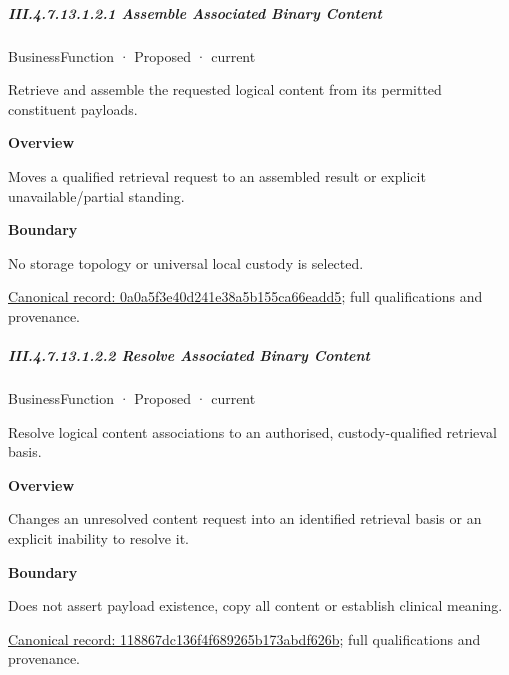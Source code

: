 \subparagraph*{III.4.7.13.1.2.1 Assemble Associated Binary Content}
\label{navigation:III.4.7.13.1.2.1}

\label{element:0a0a5f3e40d241e38a5b155ca66eadd5}
{\small BusinessFunction · Proposed · current}\par

Retrieve and assemble the requested logical content from its permitted constituent payloads.



\textbf{Overview}



Moves a qualified retrieval request to an assembled result or explicit unavailable/partial standing.



\textbf{Boundary}



No storage topology or universal local custody is selected.


{\footnotesize \href{../../../../continuum/business/business-function/0a0a5f3e40d241e38a5b155ca66eadd5.md}{Canonical record: 0a0a5f3e40d241e38a5b155ca66eadd5}; full qualifications and provenance.}\par
\subparagraph*{III.4.7.13.1.2.2 Resolve Associated Binary Content}
\label{navigation:III.4.7.13.1.2.2}

\label{element:118867dc136f4f689265b173abdf626b}
{\small BusinessFunction · Proposed · current}\par

Resolve logical content associations to an authorised, custody-qualified retrieval basis.



\textbf{Overview}



Changes an unresolved content request into an identified retrieval basis or an explicit inability to resolve it.



\textbf{Boundary}



Does not assert payload existence, copy all content or establish clinical meaning.


{\footnotesize \href{../../../../continuum/business/business-function/118867dc136f4f689265b173abdf626b.md}{Canonical record: 118867dc136f4f689265b173abdf626b}; full qualifications and provenance.}\par
